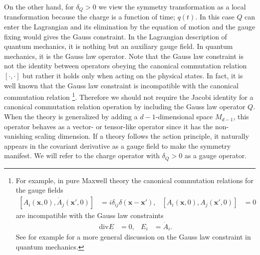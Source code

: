 \documentclass[12pt]{article}
\numberwithin{equation}{section}
\begin{document}
On the other hand, for $\delta_{Q}> 0$ 
we view the symmetry transformation as a local transformation 
because the charge is a function of time; $q(t)$. 
In this case $Q$ can enter the Lagrangian 
and its elimination by the equation of motion and the gauge fixing 
would gives the Gauss constraint. 
In the Lagrangian description of quantum mechanics, 
it is nothing but an auxiliary gauge field. 
In quantum mechanics, it is the Gauss law operator. 
Note that the Gauss law constraint is not the identity between 
operators obeying the canonical commutation relation $[\cdot, \cdot]$ 
but rather it holds only when acting on the physical states. 
In fact, it is well known that 
the Gauss law constraint is incompatible with the canonical commutation relation 
\footnote{
For example, in pure Maxwell theory the canonical commutation relations for the gauge fields 
\begin{align}
\label{qed1}
[A_{i}(\bm{x},0),\dot{A}_{j}(\bm{x}',0)]&=i\delta_{ij}\delta(\bm{x}-\bm{x}'),& 
[A_{i}(\bm{x},0),A_{j}(\bm{x}',0)]&=0
\end{align}
are incompatible with the Gauss law constraints 
\begin{align}
\label{qed2}
\mathrm{div} E&=0,& E_{i}&=\dot{A}_{i}. 
\end{align}
See for example \cite{Strocchi:2016kce} for a more general discussion on the Gauss law constraint in quantum mechanics. 
}. 
Therefore we should not require the Jacobi identity 
for a canonical commutation relation operation by including the Gauss law operator $Q$. 
When the theory is generalized 
by adding a $d-1$-dimensional space $M_{d-1}$, 
this operator behaves as a vector- or tensor-like operator 
since it has the non-vanishing scaling dimension. 
If a theory follows the action principle, 
it naturally appears in the covariant derivative as a gauge field 
to make the symmetry manifest. 
We will refer to the charge operator with $\delta_{Q}>0$ as a gauge operator. 
\end{document}
